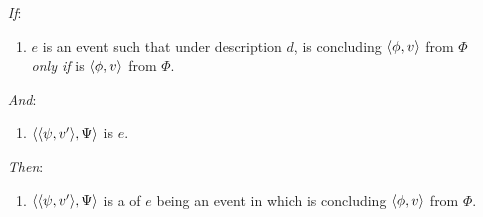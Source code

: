 \begin{note}
  \begin{proposition}
    \label{prop:hinge}


    \begin{itemize}
    \item[\emph{If}:]
      \begin{enumerate}[label=\alph*., ref=(\alph*), series=propHingeSer]
      \item
        \label{prop:hinge:typical}
        \(e\) is an event such that under description \(d\), \vAgent{} is concluding \(\langle \phi, v \rangle\) from \(\Phi\) \emph{only if} \vAgent{} is \tCV{} \(\langle \phi, v \rangle\) from \(\Phi\).
      \end{enumerate}
    \item[\emph{And}:]
      \begin{enumerate}[label=\alph*., ref=(\alph*), resume*=propHingeSer]
      \item
        \label{prop:hinge:rep}
        \(\langle \langle \psi, v' \rangle, \Psi \rangle\) is \tRep{} \(e\).
      \end{enumerate}
    \item[\emph{Then}:]
      \begin{enumerate}[label=\alph*., ref=(\alph*), resume*=propHingeSer]
      \item
        \label{prop:hinge:requ}
        \(\langle \langle \psi, v' \rangle, \Psi \rangle\) is a \requ{} of \(e\) being an event in which \vAgent{} is concluding \(\langle \phi, v \rangle\) from \(\Phi\).
      \end{enumerate}
    \end{itemize}
    \vspace{-\baselineskip}
  \end{proposition}


\end{note}
